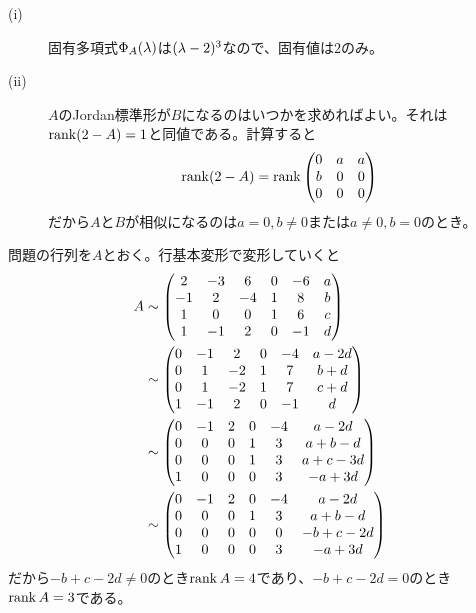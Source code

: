 \newpage



\begin{sol} ${}$
  \begin{description}
\item[(i)] 固有多項式$\Phi_A({\lambda})$は$({\lambda} - 2)^3$なので、固有値は$2$のみ。
\item[(ii)] $A$のJordan標準形が$B$になるのはいつかを求めればよい。それは$\operatorname{rank} (2 - A) = 1$と同値である。計算すると
\[
\operatorname{rank} (2 - A) = \operatorname{rank} \begin{pmatrix} 
0 &a& a \\ b& 0& 0 \\ 0& 0& 0
 \end{pmatrix}
\]
だから$A$と$B$が相似になるのは$a=0, b \neq 0$または$a \neq 0, b=0$のとき。
  \end{description}
\end{sol}

\newpage


\begin{sol}
  問題の行列を$A$とおく。行基本変形で変形していくと
  \begin{align*}
    A &\sim \begin{pmatrix}  2 &-3& 6& 0& -6& a \\ -1& 2& -4& 1& 8& b \\ 1& 0& 0& 1& 6& c \\ 1& -1& 2& 0& -1& d  \end{pmatrix} \\
    &\sim \begin{pmatrix}  0 &-1& 2& 0& -4& a-2d \\ 0& 1& -2& 1 &7& b+d \\ 0& 1& -2& 1& 7& c+d \\  1& -1& 2& 0& -1& d  \end{pmatrix}  \\
    &\sim \begin{pmatrix}  0 &-1& 2& 0& -4& a-2d \\  0& 0& 0& 1& 3& a+b-d \\ 0& 0& 0& 1& 3& a + c - 3d \\ 1& 0& 0& 0& 3& -a+3d \end{pmatrix} \\
    &\sim \begin{pmatrix}  0& -1& 2& 0& -4& a-2d \\ 0& 0& 0& 1& 3& a+b-d \\ 0& 0& 0& 0& 0& -b+c-2d \\  1& 0& 0& 0& 3& -a+3d \end{pmatrix}
  \end{align*}
  だから$-b+c-2d \neq 0$のとき$\operatorname{rank} A = 4$であり、$-b+c-2d = 0$のとき$\operatorname{rank} A = 3$である。
\end{sol}
